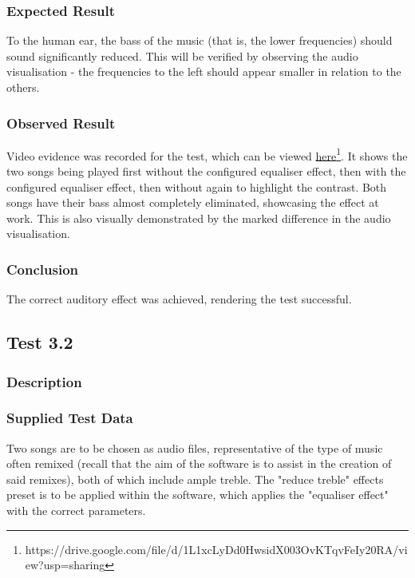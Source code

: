 \subsubsection*{Expected Result}
To the human ear, the bass of the music (that is, the lower frequencies) should sound significantly reduced. This will be verified by observing the audio visualisation - the frequencies to the left should appear smaller in relation to the others.

\subsubsection*{Observed Result}
\label{sec:evidence3.1}
Video evidence was recorded for the test, which can be viewed \href{https://drive.google.com/file/d/1L1xcLyDd0HwsidX003OvKTqvFeIy20RA/view?usp=sharing}{here}\footnote{
	https://drive.google.com/file/d/1L1xcLyDd0HwsidX003OvKTqvFeIy20RA/view?usp=sharing
}. It shows the two songs being played first without the configured equaliser effect, then with the configured equaliser effect, then without again to highlight the contrast. Both songs have their bass almost completely eliminated, showcasing the effect at work. This is also visually demonstrated by the marked difference in the audio visualisation.

\subsubsection*{Conclusion}
The correct auditory effect was achieved, rendering the test successful.


\pagebreak
\subsection{Test 3.2}
\subsubsection*{Description}
\paragraph{}
{
	\centering
}

\subsubsection*{Supplied Test Data}
Two songs are to be chosen as audio files, representative of the type of music often remixed (recall that the aim of the software is to assist in the creation of said remixes), both of which include ample treble. The "reduce treble" effects preset is to be applied within the software, which applies the "equaliser effect" with the correct parameters.

